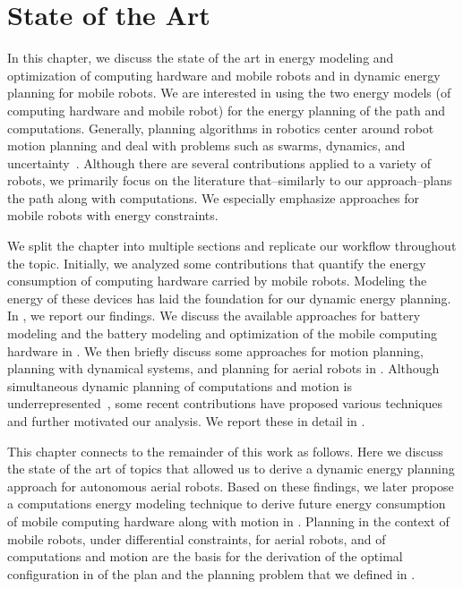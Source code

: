 
\chapter{State of the Art}
\label{cp:soa}


In this chapter, we discuss the state of the art in energy modeling and optimization of computing hardware and mobile robots and in dynamic energy planning for mobile robots. We are interested in using the two energy models (of computing hardware and mobile robot) for the energy planning of the path and computations. Generally, planning algorithms in robotics center around robot motion planning and deal with problems such as swarms, dynamics, and uncertainty~\citep{lavalle2006planning}. Although there are several contributions applied to a variety of robots, we primarily focus on the literature that--similarly to our approach--plans the path along with computations. We especially emphasize approaches for mobile robots with energy constraints. 

We split the chapter into multiple sections and replicate our workflow throughout the topic. Initially, we analyzed some contributions that quantify the energy consumption of computing hardware carried by mobile robots. Modeling the energy of these devices has laid the foundation for our dynamic energy planning. In , we report our findings. We discuss the available approaches for battery modeling and the battery modeling and optimization of the mobile computing hardware in . We then briefly discuss some approaches for motion planning, planning with dynamical systems, and planning for aerial robots in . Although simultaneous dynamic planning of computations and motion is underrepresented~\citep{sudhakar2020balancing}, some recent contributions have proposed various techniques and further motivated our analysis. We report these in detail in .

This chapter connects to the remainder of this work as follows. Here we discuss the state of the art of topics that allowed us to derive a dynamic energy planning approach for autonomous aerial robots. Based on these findings, we later propose a computations energy modeling technique to derive future energy consumption of mobile computing hardware along with motion in . Planning in the context of mobile robots, under differential constraints, for aerial robots, and of computations and motion are the basis for the derivation of the optimal configuration in  of the plan and the planning problem that we defined in .


